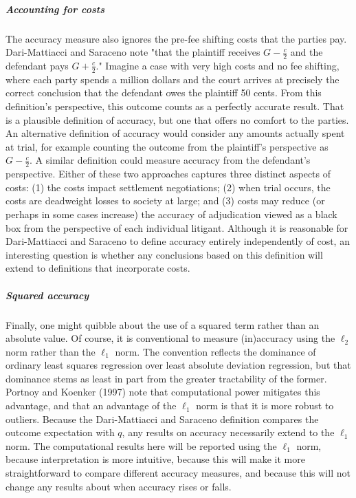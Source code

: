 \documentclass{article}
\begin{document}
\subparagraph{Accounting for costs}The accuracy measure also ignores the pre-fee shifting costs that the parties pay. Dari-Mattiacci and Saraceno note "that the plaintiff receives $G - \frac{c}{2}$ and the defendant pays $G + \frac{c}{2}$." Imagine a case with very high costs and no fee shifting, where each party spends a million dollars and the court arrives at precisely the correct conclusion that the defendant owes the plaintiff 50 cents. From this definition's perspective, this outcome counts as a perfectly accurate result. That is a plausible definition of accuracy, but one that offers no comfort to the parties. An alternative definition of accuracy would consider any amounts actually spent at trial, for example counting the outcome from the plaintiff's perspective as $G - \frac{c}{2}$. A similar definition could measure accuracy from the defendant's perspective. Either of these two approaches captures three distinct aspects of costs: (1) the costs impact settlement negotiations; (2) when trial occurs, the costs are deadweight losses to society at large; and (3) costs may reduce (or perhaps in some cases increase) the accuracy of adjudication viewed as a black box from the perspective of each individual litigant. Although it is reasonable for Dari-Mattiacci and Saraceno to define accuracy entirely independently of cost, an interesting question is whether any conclusions based on this definition will extend to definitions that incorporate costs.

\subparagraph{Squared accuracy}Finally, one might quibble about the use of a squared term rather than an absolute value. Of course, it is conventional to measure (in)accuracy using the $\ell_2$ norm rather than the $\ell_1$ norm. The convention reflects the dominance of ordinary least squares regression over least absolute deviation regression, but that dominance stems as least in part from the greater tractability of the former. Portnoy and Koenker (1997) \cite{portnoykoenker} note that computational power mitigates this advantage, and that an advantage of the $\ell_1$ norm is that it is more robust to outliers. Because the Dari-Mattiacci and Saraceno definition compares the outcome expectation with $q$, any results on accuracy necessarily extend to the $\ell_1$ norm. The computational results here will be reported using the $\ell_1$ norm, because interpretation is more intuitive, because this will make it more straightforward to compare different accuracy measures, and because this will not change any results about when accuracy rises or falls.
\end{document}
